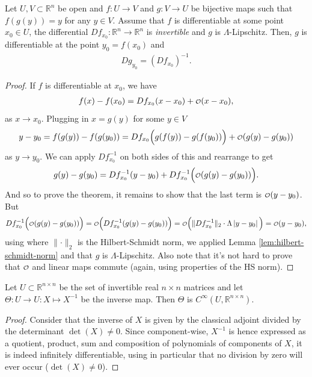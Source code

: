 \begin{lemma}\label{lem:auto-diff-inv}
    Let $U, V \subset \mathbb{R}^{n}$ be open and $f: U \to V$ and $g: V \to U$ be bijective maps such that $f(g(y)) = y$ for any $y \in V$. Assume that $f$ is differentiable at some point $x_{0} \in U$, the differential $Df_{x_{0}}: \mathbb{R}^{n} \to \mathbb{R}^{n}$ is \textit{invertible} and $g$ is $\Lambda$-Lipschitz. Then, $g$ is differentiable at the point $y_{0} = f(x_{0})$ and 
    \begin{align*}
       Dg_{y_{0}} = (Df_{x_{0}})^{-1}.
    \end{align*}
\end{lemma}
\begin{proof}
    If $f$ is differentiable at $x_{0}$, we have
    \begin{align*}
        f(x) - f(x_{0}) = Df_{x_{0}}(x-x_{0}) + \smalO (x - x_{0}),
    \end{align*}
    as $x \to x_{0}$. Plugging in $x = g(y)$ for some $y \in V$
    \begin{align*}
        y - y_{0} = f(g(y)) - f(g(y_{0})) = Df_{x_{0}}\Big(g(f(y)) - g(f(y_{0}))\Big) + \smalO( g(y) - g(y_{0}) )
    \end{align*}
    as $y \to y_{0}$. We can apply $Df_{x_{0}}^{-1}$ on both sides of this and rearrange to get
    \begin{align*}
        g(y) - g(y_{0}) = Df_{x_{0}}^{-1}(y - y_{0}) + Df_{x_{0}}^{-1} \Big( \smalO(g(y) - g(y_{0})) \Big).
    \end{align*}
    And so to prove the theorem, it remains to show that the last term is $\smalO(y - y_{0})$. But 
    \begin{align*}
        Df_{x_{0}}^{-1} \Big( \smalO ( g(y) - g(y_{0}) ) \Big) = \smalO \Big( Df_{x_{0}}^{-1}( g(y) - g(y_{0}))  \Big) = \smalO \Big(  \lVert Df_{x_{0}}^{-1} \rVert_{2} \cdot \Lambda \left| y - y_{0} \right|  \Big) = \smalO (y - y_{0}),
    \end{align*}
    using where $\lVert \cdot  \rVert_{2}$ is the Hilbert-Schmidt norm, we applied Lemma \ref{lem:hilbert-schmidt-norm} and that $g$ is $\Lambda$-Lipschitz. Also note that it's not hard to prove that $\smalO$ and linear maps commute (again, using properties of the HS norm).
\end{proof}

\begin{lemma}\label{lem:smoothness-inverse}
    Let $U \subset \mathbb{R}^{n \times n}$ be the set of invertible real $n \times n$ matrices and let $\Theta: U \to U: X \mapsto X^{-1}$ be the inverse map. Then $\Theta$ is $C^{\infty}(U, \mathbb{R}^{n \times n})$.
\end{lemma}
\begin{proof}
    Consider that the inverse of $X$ is given by the classical adjoint divided by the determinant $\det (X) \neq 0$. Since component-wise, $X^{-1}$ is hence expressed as a quotient, product, sum and composition of polynomials of components of $X$, it is indeed infinitely differentiable, using in particular that no division by zero will ever occur ($\det (X) \neq 0$).
\end{proof}



